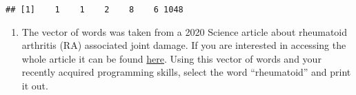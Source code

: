 \documentclass[
]{article}
\newenvironment{Shaded}{\begin{snugshade}}{\end{snugshade}}
\providecommand{\tightlist}{%
  \setlength{\itemsep}{0pt}\setlength{\parskip}{0pt}}
\begin{document}
\begin{verbatim}
## [1]    1    1    2    8    6 1048
\end{verbatim}

\begin{enumerate}
\def\labelenumi{\arabic{enumi})}
\setcounter{enumi}{3}
\tightlist
\item
  The vector of words was taken from a 2020 Science article about
  rheumatoid arthritis (RA) associated joint damage. If you are
  interested in accessing the whole article it can be found
  \href{https://www.science.org/doi/10.1126/sciadv.abd2688}{here}. Using
  this vector of words and your recently acquired programming skills,
  select the word ``rheumatoid'' and print it out.
\end{enumerate}

\begin{Shaded}
\begin{Highlighting}[]

\end{Highlighting}
\end{Shaded}
\end{document}
